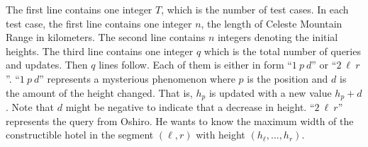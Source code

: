 The first line contains one integer $T$, which is the number of test cases. 
In each test case, the first line contains one integer $n$, 
the length of Celeste Mountain Range in kilometers.
The second line contains $n$ integers denoting the initial heights. 
The third line contains one integer $q$ which is the total number of 
queries and updates. 
Then $q$ lines follow. 
Each of them is either in form ``$1~p~d$'' or ``$2~\ell~r$''. 
``$1~p~d$'' represents a mysterious phenomenon 
where $p$ is the position and $d$ is the amount of the height changed.
That is, $h_p$ is updated with a new value $h_p+d$.
Note that $d$ might be negative to indicate that a decrease in height.
``$2~\ell~r$'' represents the query from Oshiro. He wants to know the maximum
width of the constructible hotel in the segment $(\ell,r)$ with 
height $(h_\ell,\ldots,h_r)$.
